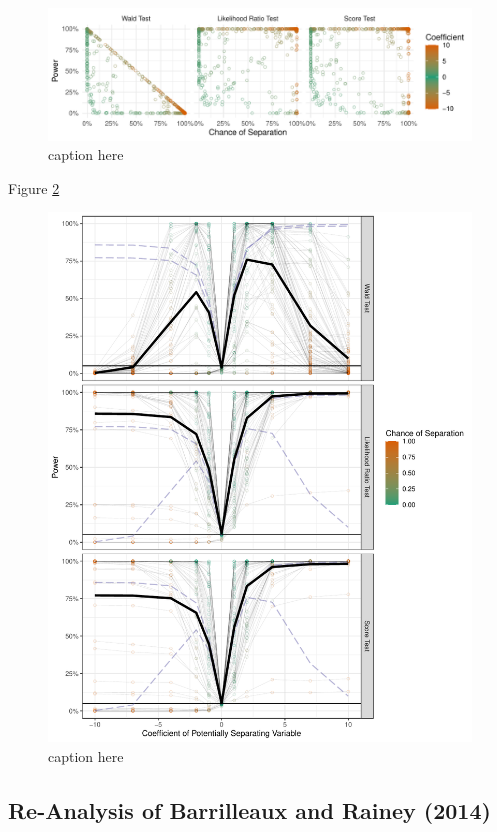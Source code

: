 \documentclass[
]{article}
\begin{document}
\begin{figure}[h]
\includegraphics[width=\textwidth]{doc/fig/many-sims.pdf}
\caption{caption here}\label{fig:many-sims}
\end{figure}

Figure \ref{fig:power-funs}

\begin{figure}[h]
\includegraphics[width=\textwidth]{doc/fig/power-funs.pdf}
\caption{caption here}\label{fig:power-funs}
\end{figure}

\hypertarget{re-analysis-of-barrilleaux-and-rainey-2014}{%
\subsection{Re-Analysis of Barrilleaux and Rainey
(2014)}\label{re-analysis-of-barrilleaux-and-rainey-2014}}
\end{document}
